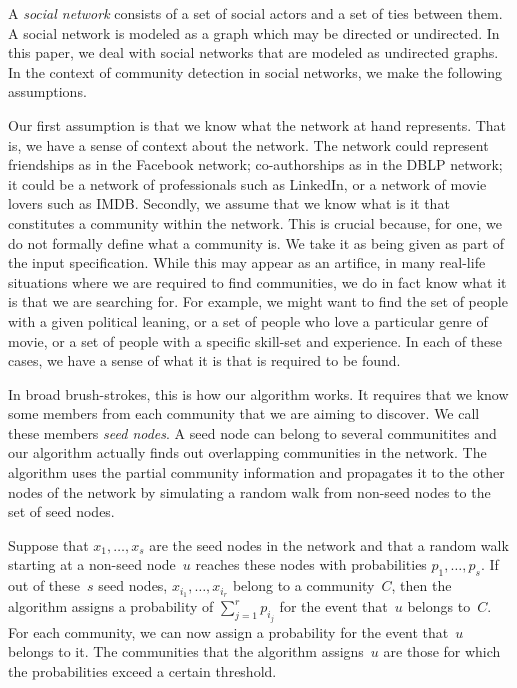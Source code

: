 A \emph{social network} consists of a set of social actors and a set of ties 
between them. A social network is modeled as a graph which may be directed 
or undirected. In this paper, we deal with social networks that are modeled as undirected 
graphs. In the context of community detection in social networks, we make 
the following assumptions. 

Our first assumption is that we know what the network at hand represents. That is, 
we have a sense of context about the network. The network could represent 
friendships as in the Facebook network; co-authorships as in the DBLP network; 
it could be a network of professionals such as LinkedIn, or a network of movie 
lovers such as IMDB. Secondly, we assume that we know what is it that constitutes 
a community within the network. This is crucial because, for one, we do not 
formally define what a community is. We take it as being given as part of the 
input specification. While this may appear as an artifice, in many real-life situations 
where we are required to find communities, we do in fact know what 
it is that we are searching for. For example, we might want to find the set of 
people with a given political leaning, or a set of people who love a particular 
genre of movie, or a set of people with a specific skill-set and experience. 
In each of these cases, we have a sense of what it is that is required to be found. 

In broad brush-strokes, this is how our algorithm works.  It requires that we know
some members from each community that we are aiming to discover. We call these members 
\emph{seed nodes}. A seed node can belong to several communitites and our algorithm 
actually finds out overlapping communities in the network. The algorithm uses the 
partial community information and propagates it to the other nodes of the network 
by simulating a random walk from non-seed nodes to the set of seed nodes. 

Suppose that $x_1, \ldots, x_s$ are the seed nodes in the network and that a random walk starting at 
a non-seed node~$u$ reaches these nodes with probabilities $p_1, \ldots, p_s$. If out 
of these~$s$ seed nodes, $x_{i_1}, \ldots, x_{i_r}$ belong to a community~$C$, then 
the algorithm assigns a probability of $\sum_{j = 1}^r p_{i_j}$ for the event 
that~$u$ belongs to~$C$. For each community, we can now assign a probability for 
the event that~$u$ belongs to it. The communities that the algorithm 
assigns~$u$ are those for which the probabilities exceed a certain threshold. 

